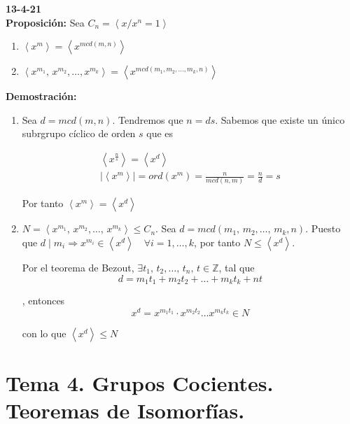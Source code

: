 \documentclass{article}
\begin{document}
\textbf{13-4-21} \\

\textbf{Proposición:} Sea $C_n=\left\langle x/x^n=1\right\rangle$

\begin{enumerate}[(1)]
\item $\left\langle x^m\right\rangle = \left\langle x^{mcd(m,n)}\right\rangle$
\item $\left\langle x^{m_1},\,x^{m_2},\ldots,x^{m_k}\right\rangle = \left\langle x^{mcd(m_1,m_2,\ldots,m_k,n)}\right\rangle$
\end{enumerate}

\textbf{Demostración:}

\begin{enumerate}[(1)]
\item Sea $d=mcd(m,n)$. Tendremos que $n=ds$. Sabemos que existe un único subrgrupo cíclico de orden $s$ que es 

\begin{gather*}
\left\langle x^{\frac{n}{s}}\right\rangle = \left\langle x^d \right\rangle \\
|\left\langle x^m\right\rangle|=ord(x^m)=\frac{n}{mcd(n,m)}=\frac{n}{d}=s
\end{gather*}

Por tanto $\left\langle x^m\right\rangle = \left\langle x^d\right\rangle$

\item $N=\left\langle x^{m_1},\,x^{m_2},\ldots,\,x^{m_k}\right\rangle \leq C_n$. Sea $d=mcd(m_1,\,m_2,\ldots,\,m_k,n)$. Puesto que $d\mid m_i \Rightarrow x^{m_i}\in \left\langle x^d\right\rangle \quad 	\forall i=1,\ldots,k$, por tanto $N\leq \left\langle x^d\right\rangle$.

Por el teorema de Bezout, $\exists t_1,\,t_2,\ldots,\,t_n,\,t\in \mathbb{Z}$, tal que 
\begin{equation*}
d=m_1t_1+m_2t_2+\ldots+m_kt_k+nt
\end{equation*}

, entonces
\begin{equation*}
x^d=x^{m_1t_1}\cdot x^{m_2t_2}\ldots x^{m_kt_k}\in N
\end{equation*}

con lo que $\left\langle x^d\right\rangle \leq N$
\end{enumerate}

\section{Tema 4. Grupos Cocientes. Teoremas de Isomorfías.}
\end{document}
